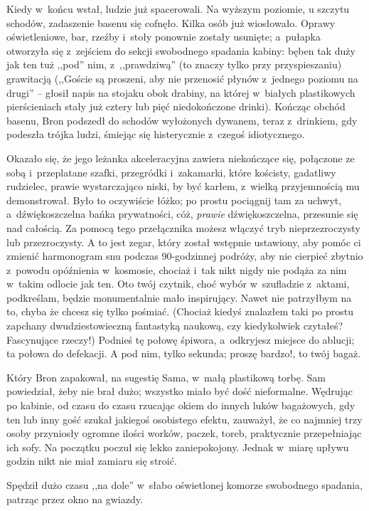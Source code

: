 \documentclass[oneside,polish,11pt,rmheadings]{mwbk}
\begin{document}
Kiedy w~końcu wstał, ludzie już spacerowali. Na wyższym poziomie, u szczytu schodów, zadaszenie basenu się cofnęło. Kilka osób już wiosłowało. Oprawy oświetleniowe, bar, rzeźby i~stoły ponownie zostały usunięte; a~pułapka otworzyła się z~zejściem do sekcji swobodnego spadania kabiny: bęben tak duży jak ten tuż ,,pod'' nim, z~,,prawdziwą'' (to znaczy tylko przy przyspieszaniu) grawitacją (,,Goście są proszeni, aby nie przenosić płynów z~jednego poziomu na drugi'' -- głosił napis na stojaku obok drabiny, na której w~białych plastikowych pierścieniach stały już cztery lub pięć niedokończone drinki). Kończąc obchód basenu, Bron podszedł do schodów wyłożonych dywanem, teraz z~drinkiem, gdy podeszła trójka ludzi, śmiejąc się histerycznie z~czegoś idiotycznego. 

Okazało się, że jego leżanka akceleracyjna zawiera niekończące się, połączone ze sobą i~przeplatane szafki, przegródki i~zakamarki, które kościsty, gadatliwy rudzielec, prawie wystarczająco niski, by być karłem, z~wielką przyjemnością mu demonstrował. Było to oczywiście łóżko; po prostu pociągnij tam za uchwyt, a~dźwiękoszczelna bańka prywatności, cóż, \textit{prawie }dźwiękoszczelna, przesunie się nad całością. Za pomocą tego przełącznika możesz włączyć tryb nieprzezroczysty lub przezroczysty. A to jest zegar, który został wstępnie ustawiony, aby pomóc ci zmienić harmonogram snu podczas 90-godzinnej podróży, aby nie cierpieć zbytnio z~powodu opóźnienia w~kosmosie, chociaż i~tak nikt nigdy nie podąża za nim w~takim odlocie jak ten. Oto twój czytnik, choć wybór w~szufladzie z~aktami, podkreślam, będzie monumentalnie mało inspirujący. Nawet nie patrzyłbym na to, chyba że chcesz się tylko pośmiać. (Chociaż kiedyś znalazłem taki po prostu zapchany dwudziestowieczną fantastyką naukową, czy kiedykolwiek czytałeś? Fascynujące rzeczy!) Podnieś tę połowę śpiwora, a~odkryjesz miejsce do ablucji; ta połowa do defekacji. A pod nim, tylko sekunda; proszę bardzo!, to twój bagaż. 

Który Bron zapakował, na sugestię Sama, w~małą plastikową torbę. Sam powiedział, żeby nie brał dużo; wszystko miało być dość nieformalne. Wędrując po kabinie, od czasu do czasu rzucając okiem do innych luków bagażowych, gdy ten lub inny gość szukał jakiegoś osobistego efektu, zauważył, że co najmniej trzy osoby przyniosły ogromne ilości worków, paczek, toreb, praktycznie przepełniając ich sofy. Na początku poczuł się lekko zaniepokojony. Jednak w~miarę upływu godzin nikt nie miał zamiaru się stroić. 

Spędził dużo czasu ,,na dole'' w~słabo oświetlonej komorze swobodnego spadania, patrząc przez okno na gwiazdy. 
\end{document}
